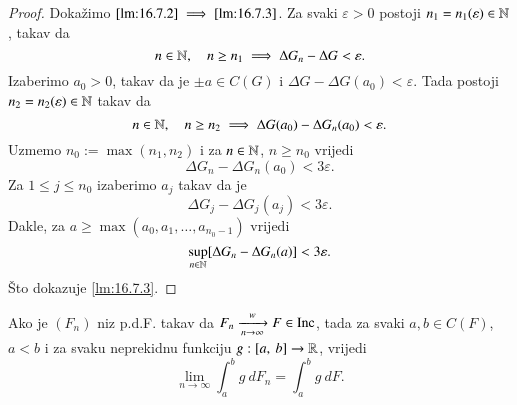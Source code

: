 \begin{proof}
    Doka\v zimo $\ref{lm:16.7.2} \implies \ref{lm:16.7.3}$.
    Za svaki $\varepsilon > 0$ postoji $n_1 = n_1 (\varepsilon) \in \mathbb{N}$, takav da
    \begin{equation*}
        n \in \mathbb{N}, \quad n \geq n_1 \implies \Delta G_n - \Delta G < \varepsilon.
    \end{equation*}
    Izaberimo $a_0 > 0$, takav da je $\pm a \in C(G)$ i $\Delta G - \Delta G (a_0) < \varepsilon$.
    Tada postoji $n_2 = n_2 (\varepsilon) \in \mathbb{N}$ takav da
    \begin{equation*}
        n \in \mathbb{N}, \quad n \geq n_2 \implies \Delta G (a_0) - \Delta G_n (a_0) < \varepsilon.
    \end{equation*}
    Uzmemo $n_0 := \max (n_1, n_2)$ i za $n \in \mathbb{N}$, $n \geq n_0$ vrijedi
    \begin{equation*}
        \Delta G_n - \Delta G_n (a_0) < 3 \varepsilon.
    \end{equation*}
    Za $1 \leq j \leq n_0$ izaberimo $a_j$ takav da je
    \begin{equation*}
        \Delta G_j - \Delta G_j (a_j) < 3 \varepsilon.
    \end{equation*}
    Dakle, za $a \geq \max (a_0, a_1, \ldots, a_{n_0 - 1})$ vrijedi
    \begin{equation*}
        \sup\limits_{n \in \mathbb{N}} [ \Delta G_n - \Delta G_n (a) ] < 3 \varepsilon.
    \end{equation*}
    \v Sto dokazuje \ref{lm:16.7.3}.
\end{proof}

\begin{tm}  \label{tm:16.8}
    Ako je $(F_n)$ niz p.d.F. takav da $F_n \xrightarrow[n \to \infty]{w} F \in \mathrm{Inc}$, tada za svaki $a, b \in C(F)$, $a < b$ i za svaku neprekidnu funkciju $g : [{a}, \:{b}] \to \mathbb{R}$, vrijedi
    \begin{equation*}
        \lim\limits_{n \to \infty} \int_a^b g \: d F_n = \int_a^b g \: d F.
    \end{equation*}
\end{tm}

